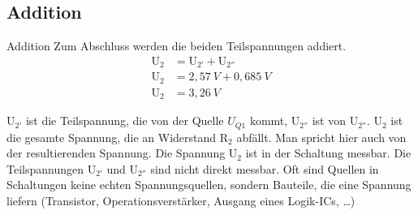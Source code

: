 \documentclass[aspectratio=169, ignorenonframetext]{beamer}
\begin{document}
\subsection{Addition}
\begin{frame}{Addition}
  Zum Abschluss werden die beiden Teilspannungen addiert.
  \begin{align}
    \text{U}_2 &= \text{U}_{2'} + \text{U}_{2''}\\
    \text{U}_2 &= 2,57\ V + 0,685\ V\\
    \text{U}_2 &= 3,26\ V
  \end{align}
\end{frame}
$\text{U}_{2'}$ ist die Teilspannung, die von der Quelle $U\text{}_{Q1}$ kommt, $\text{U}_{2''}$ ist von $\text{U}_{2''}$. $\text{U}_2$ ist die gesamte  Spannung, die an Widerstand $\text{R}_2$ abfällt. Man spricht hier auch von der resultierenden Spannung. Die Spannung $\text{U}_2$ ist in der Schaltung messbar. Die Teilspannungen $\text{U}_{2'}$ und $\text{U}_{2''}$ sind nicht direkt messbar. Oft sind Quellen in Schaltungen keine echten Spannungsquellen, sondern Bauteile, die eine Spannung liefern (Transistor, Operationsverstärker, Ausgang eines Logik-ICs, \dots)
\end{document}
